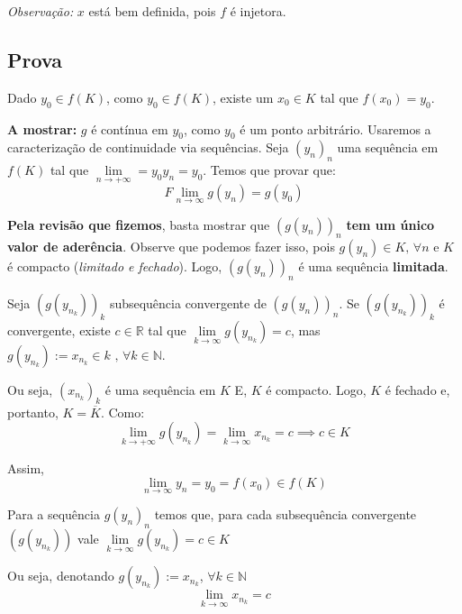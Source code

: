 \documentclass[12pt]{article}
\begin{document}
    \textit{Observação: } $x$ está bem definida, pois $f$ é injetora.

    \subsection*{Prova}
    Dado $y_0 \in f(K)$, como $y_0 \in f(K)$, existe um $x_0 \in K$ tal que $f(x_0) = y_0$.

    \textbf{A mostrar: } $g$ é contínua em $y_0$, como $y_0$ é um ponto arbitrário. Usaremos a caracterização de continuidade via sequências. Seja $(y_n)_n$ uma sequência em $f(K)$ tal que $\lim \limits_{n \to +\infty} = y_0 y_n = y_0$. Temos que provar que:
    \begin{equation*}F
        \lim \limits_{n \to \infty} g(y_n) = g(y_0)
    \end{equation*}

    \textbf{Pela revisão que fizemos}, basta mostrar que $\left( g(y_n)\right)_n$ \textbf{tem um único valor de aderência}. Observe que podemos fazer isso, pois $g(y_n) \in K \text{, } \forall n$ e $K$ é compacto (\textit{limitado e fechado}). Logo, $\left( g(y_n)\right)_n$ é uma sequência \textbf{limitada}.

    Seja $\left( g(y_{n_k})\right)_k$ subsequência convergente de $\left( g(y_n)\right)_n$. Se $\left( g(y_{n_k})\right)_k$ é convergente, existe $c \in \mathbb{R}$ tal que $\lim \limits_{k \to \infty} g(y_{n_k}) = c$, mas $g(y_{n_k}) := x_{n_k} \in k \text{ , } \forall k \in \mathbb{N}$.

    Ou seja, $(x_{n_k})_k$ é uma sequência em $K$ E, $K$ é compacto. Logo, $K$ é fechado e, portanto, $K = \overline{K}$. Como:
    \begin{equation*}
        \lim \limits_{k \to +\infty} g(y_{n_k}) = \lim \limits_{k \to \infty} x_{n_k} = c \implies c \in K
    \end{equation*}

    Assim,
    \begin{equation}
        \lim \limits_{n \to \infty} y_n = y_0 = f(x_0) \in f(K)
        \label{eq:um}
    \end{equation}

    Para a sequência $g(y_n)_n$ temos que, para cada subsequência convergente $\left(g(y_{n_k}) \right)$ vale $\lim \limits_{k \to \infty} g(y_{n_k}) = c \in K$

    Ou seja, denotando $g(y_{n_k}) := x_{n_k}$, $\forall k \in \mathbb{N}$
    \begin{equation*}
        \lim \limits_{k \to \infty} x_{n_k} = c  
    \end{equation*}
\end{document}
